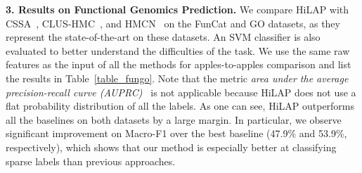 \documentclass[11pt,a4paper]{article}
\newcommand{\ie}{\textit{i.e.}} \newcommand{\eg}{\textit{e.g.}}
\begin{document}
\begin{table}[t]
    \caption{\textbf{Performance comparison on Functional Catalogue and Gene Ontology.} We compare with state-of-the-art hierarchical classification methods that take exactly the same raw features as input (\ie, we exclude models designed specifically for text objects).} 
    \label{table_fungo}
    \centering
        \vspace{-.1cm}
\vspace*{-.1cm}
\end{table}

\smallskip
\noindent
\textbf{3. Results on Functional Genomics Prediction.}
We compare HiLAP with CSSA~\cite{bi2011multi}, CLUS-HMC~\citep{vens2008decision}, and HMCN~\citep{wehrmann2018hierarchical} on the FunCat and GO datasets, as they represent the state-of-the-art on these datasets.
An SVM classifier is also evaluated to better understand the difficulties of the task.
We use the same raw features as the input of all the methods for apples-to-apples comparison and list the results in Table~\ref{table_fungo}.
Note that the metric \textit{area under the average precision-recall curve (AUPRC)}~\cite{wehrmann2018hierarchical} is not applicable because HiLAP does not use a flat probability distribution of all the labels.
As one can see, HiLAP outperforms all the baselines on both datasets by a large margin.
In particular, we observe significant improvement on Macro-F1 over the best baseline (47.9\% and 53.9\%, respectively), which shows that our method is especially better at classifying sparse labels than previous approaches.
\end{document}
